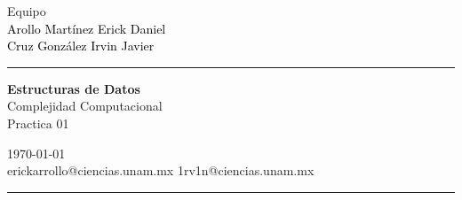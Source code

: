 \documentclass[a4paper,10pt]{article}
\begin{document}
\fancyhead[C]{}
\begin{minipage}{0.295\textwidth} 
\raggedright
Equipo\\    
\footnotesize 
\colorbox[rgb]{0.67, 0.88, 0.69}{\textcolor{black}{Arollo Martínez Erick Daniel}}
\\\colorbox[rgb]{0.96, 0.76, 0.76}{\textcolor{black}{Cruz González Irvin Javier}}
\textcolor[rgb]{0.0, 0.72, 0.92}{\medskip\hrule}
\end{minipage}
\begin{minipage}{0.4\textwidth} 
\centering 
\large 
\textbf{Estructuras de Datos}\\ 
\normalsize 
Complejidad Computacional\\Practica 01\\
\end{minipage}
\begin{minipage}{0.295\textwidth} 
\raggedleft
\today\\ 
\footnotesize
erickarrollo@ciencias.unam.mx
1rv1n@ciencias.unam.mx
\textcolor[rgb]{0.0, 0.72, 0.92}{\medskip\hrule}
\end{minipage}
\end{document}
